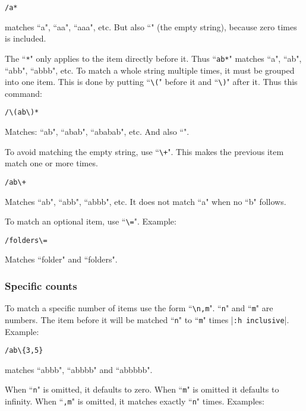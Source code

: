 \begin{Verbatim}[samepage=true]
 /a*
\end{Verbatim}

matches ``a", ``aa", ``aaa", etc.
But also ``" (the empty string), because zero times is included.

The ``\texttt{*}" only applies to the item directly before it.
Thus ``\texttt{ab*}" matches ``a", ``ab", ``abb", ``abbb", etc.
To match a whole string multiple times, it must be grouped into one item.
This is done by putting ``\texttt{\textbackslash{}(}" before it and ``\texttt{\textbackslash{})}" after it.
Thus this command:

\begin{Verbatim}[samepage=true]
 /\(ab\)*
\end{Verbatim}

Matches: ``ab", ``abab", ``ababab", etc.  And also ``".

To avoid matching the empty string, use ``\texttt{\textbackslash{}+}".
This makes the previous item match one or more times.

\begin{Verbatim}[samepage=true]
 /ab\+
\end{Verbatim}

Matches ``ab", ``abb", ``abbb", etc.
It does not match ``a" when no ``b" follows.

To match an optional item, use ``\texttt{\textbackslash{}=}".
Example:

\begin{Verbatim}[samepage=true]
 /folders\=
\end{Verbatim}

Matches ``folder" and ``folders".
\subsubsection{Specific counts}
To match a specific number of items use the form ``\texttt{\textbackslash{}{n,m}}".
``\texttt{n}" and ``\texttt{m}" are numbers.
The item before it will be matched ``\texttt{n}" to ``\texttt{m}" times |\texttt{:h inclusive}|.
Example:

\begin{Verbatim}[samepage=true]
 /ab\{3,5}
\end{Verbatim}

matches ``abbb", ``abbbb" and ``abbbbb".

When ``\texttt{n}" is omitted, it defaults to zero.
When ``\texttt{m}" is omitted it defaults to infinity.
When ``\texttt{,m}" is omitted, it matches exactly ``\texttt{n}" times.
Examples:

